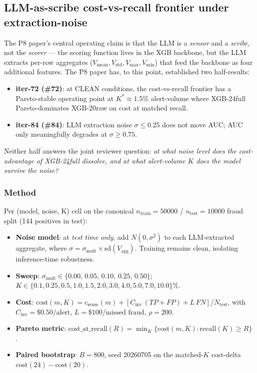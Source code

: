 \documentclass{article}
\begin{document}
 \subsection{LLM-as-scribe cost-vs-recall frontier under extraction-noise}
\label{sec:p8-noise-cost-frontier}

The P8 paper's central operating claim is that the LLM is a \emph{sensor}
and a \emph{scribe}, not the \emph{scorer} --- the scoring function lives in
the XGB backbone, but the LLM extracts per-row aggregates
($V_{\text{mean}}, V_{\text{std}}, V_{\max}, V_{\min}$) that feed the
backbone as four additional features. The P8 paper has, to this point,
established two half-results:
\begin{itemize}
\item \textbf{iter-72 (\#72)}: at CLEAN conditions, the
      cost-vs-recall frontier has a Pareto-stable operating point at
      $K^* \approx 1.5\%$ alert-volume where XGB-24full Pareto-dominates
      XGB-20raw on cost at matched recall.
\item \textbf{iter-84 (\#84)}: LLM extraction noise $\sigma \le 0.25$
      does not move AUC; AUC only meaningfully degrades at $\sigma \ge 0.75$.
\end{itemize}
Neither half answers the joint reviewer question: \emph{at what noise
level does the cost-advantage of XGB-24full dissolve, and at what
alert-volume $K$ does the model survive the noise?}

\subsubsection{Method}
Per (model, noise, K) cell on the canonical $n_{\text{train}}{=}50000$ /
$n_{\text{test}}{=}10000$ fraud split (144 positives in test):
\begin{itemize}
\item \textbf{Noise model}: at \emph{test time only}, add
      $N(0, \sigma^2)$ to each LLM-extracted aggregate, where
      $\sigma = \sigma_{\text{mult}} \times \mathrm{sd}(V_{\text{agg}})$.
      Training remains clean, isolating inference-time robustness.
\item \textbf{Sweep}:
      $\sigma_{\text{mult}} \in \{0.00,\, 0.05,\, 0.10,\, 0.25,\, 0.50\}$;
      $K \in \{0.1, 0.25, 0.5, 1.0, 1.5, 2.0, 3.0, 4.0, 5.0, 7.0, 10.0\}\%$.
\item \textbf{Cost}: $\mathrm{cost}(m, K) = c_{\text{sense}}(m) +
      [C_{\text{inv}}\,(TP+FP) + L\, FN]/N_{\text{test}}$, with
      $C_{\text{inv}}{=}\$0.50/\text{alert}$,
      $L{=}\$100/\text{missed fraud}$, $\rho {=} 200$.
\item \textbf{Pareto metric}: $\mathrm{cost\_at\_recall}(R) = \min_K
      \{\mathrm{cost}(m, K) : \mathrm{recall}(K) \ge R\}$.
\item \textbf{Paired bootstrap}: $B = 800$, seed 20260705 on the
      matched-$K$ cost-delta $\mathrm{cost}(24) - \mathrm{cost}(20)$.
\end{itemize}
\end{document}
